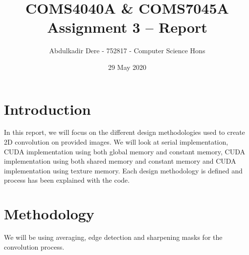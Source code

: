 

\title{COMS4040A \& COMS7045A Assignment 3 -- Report}
\author{Abdulkadir Dere - 752817 - Computer Science Hons}
\date{29 May 2020} 
\maketitle 
\pagestyle{fancy}
\fancyhf{}
\fancyhead[R]{\thepage}





\section{Introduction} 
In this report, we will focus on the different design methodologies used to create 2D convolution on provided images. We will look at serial implementation, CUDA implementation using both global memory and constant memory, CUDA implementation using both shared memory and constant memory and CUDA implementation using texture memory. Each design methodology is defined and process has been explained with the code.

\section{Methodology}
We will be using averaging, edge detection and sharpening masks for the convolution process.

